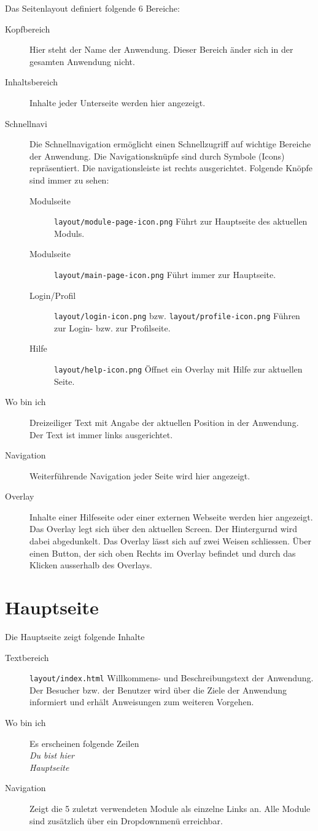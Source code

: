 Das Seitenlayout definiert folgende 6 Bereiche:
\begin{description}
  \item[Kopfbereich] Hier steht der Name der Anwendung. Dieser Bereich änder sich in der gesamten Anwendung nicht.
  \item[Inhaltsbereich] Inhalte jeder Unterseite werden hier angezeigt.
  \item[Schnellnavi] Die Schnellnavigation ermöglicht einen Schnellzugriff auf wichtige Bereiche der Anwendung. Die Navigationsknüpfe sind durch Symbole (Icons) repräsentiert. Die navigationsleiste ist rechts ausgerichtet. Folgende Knöpfe sind immer zu sehen:
  \begin{description}
    \item[Modulseite] \texttt{layout/module-page-icon.png} Führt zur Hauptseite des aktuellen Moduls. 
    \item[Modulseite] \texttt{layout/main-page-icon.png} Führt immer zur Hauptseite. 
    \item[Login/Profil] \texttt{layout/login-icon.png} bzw. \texttt{layout/profile-icon.png} Führen zur Login- bzw. zur Profilseite. 
    \item[Hilfe] \texttt{layout/help-icon.png} Öffnet ein Overlay mit Hilfe zur aktuellen Seite. 
  \end{description}
  
  \item[Wo bin ich] Dreizeiliger Text mit Angabe der aktuellen Position in der Anwendung. Der Text ist immer links ausgerichtet.
  \item[Navigation] Weiterführende Navigation jeder Seite wird hier angezeigt.
  \item[Overlay] Inhalte einer Hilfeseite oder einer externen Webseite werden hier angezeigt. Das Overlay legt sich 
  über den aktuellen Screen. Der Hintergurnd wird dabei abgedunkelt. Das Overlay lässt sich auf zwei Weisen schliessen. Über einen Button, der sich oben Rechts im Overlay befindet und durch das Klicken ausserhalb des Overlays.
\end{description}


%
%
%
\section{Hauptseite}
\label{sec:main-page}

Die Hauptseite zeigt folgende Inhalte
\begin{description}
  \item[Textbereich] \texttt{layout/index.html} Willkommens- und Beschreibungstext der Anwendung. Der Besucher bzw. der Benutzer wird über die Ziele der Anwendung informiert und erhält Anweisungen zum weiteren Vorgehen.
  \item[Wo bin ich] Es erscheinen folgende Zeilen \emph{\\Du bist hier \\Hauptseite}
  \item[Navigation] Zeigt die 5 zuletzt verwendeten Module als einzelne Links an. Alle Module sind zusätzlich über ein Dropdownmenü erreichbar.
	
\end{description}




